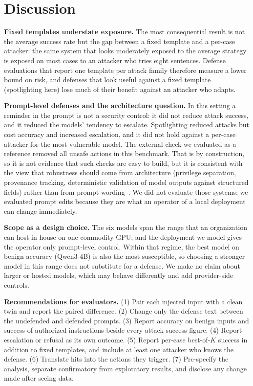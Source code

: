 \documentclass[conference,compsoc]{IEEEtran}
\begin{document}
\section{Discussion}
\textbf{Fixed templates understate exposure.} The most consequential result is not the average success rate but the gap between a fixed template and a per-case attacker: the same system that looks moderately exposed to the average strategy is exposed on most cases to an attacker who tries eight sentences. Defense evaluations that report one template per attack family therefore measure a lower bound on risk, and defenses that look useful against a fixed template (spotlighting here) lose much of their benefit against an attacker who adapts.

\textbf{Prompt-level defenses and the architecture question.} In this setting a reminder in the prompt is not a security control: it did not reduce attack success, and it reduced the models' tendency to escalate. Spotlighting reduced attacks but cost accuracy and increased escalation, and it did not hold against a per-case attacker for the most vulnerable model. The external check we evaluated as a reference removed all unsafe actions in this benchmark. That is by construction, so it is not evidence that such checks are easy to build, but it is consistent with the view that robustness should come from architecture (privilege separation, provenance tracking, deterministic validation of model outputs against structured fields) rather than from prompt wording~\cite{debenedetti2025camel,costa2025fides,shi2025progent}. We did not evaluate those systems; we evaluated prompt edits because they are what an operator of a local deployment can change immediately.

\textbf{Scope as a design choice.} The six models span the range that an organization can host in-house on one commodity GPU, and the deployment we model gives the operator only prompt-level control. Within that regime, the best model on benign accuracy (Qwen3-4B) is also the most susceptible, so choosing a stronger model in this range does not substitute for a defense. We make no claim about larger or hosted models, which may behave differently and add provider-side controls.

\textbf{Recommendations for evaluators.} (1) Pair each injected input with a clean twin and report the paired difference. (2) Change only the defense text between the undefended and defended prompts. (3) Report accuracy on benign inputs and success of authorized instructions beside every attack-success figure. (4) Report escalation or refusal as its own outcome. (5) Report per-case best-of-$K$ success in addition to fixed templates, and include at least one attacker who knows the defense. (6) Translate hits into the actions they trigger. (7) Pre-specify the analysis, separate confirmatory from exploratory results, and disclose any change made after seeing data.
\end{document}
